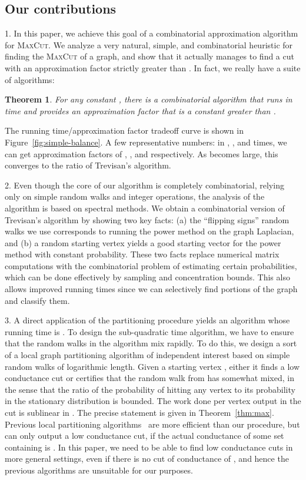 \documentclass[11pt]{article}
\newtheorem{theorem}{Theorem}[section]
\def\maxcut{\textsc{MaxCut}\xspace}
\begin{document}
\subsection{Our contributions}

1. In this paper, we achieve this goal of a combinatorial approximation
algorithm for \maxcut. We analyze a very natural, simple, and combinatorial
heuristic for finding the \maxcut of a graph, and show that it actually manages
to find a cut with an approximation factor strictly greater than . In fact, we really
have a suite of algorithms:
\begin{theorem} \label{thm:main}
For any constant , there is a combinatorial algorithm
that runs in  time and provides
an approximation factor that is a constant greater than .
\end{theorem}
The running time/approximation factor tradeoff curve is
shown in Figure~\ref{fig:simple-balance}. A few representative numbers: in
, , and  times, we can get
approximation factors of , , and  respectively. As 
becomes large, this converges to the ratio of Trevisan's algorithm.


2. Even though the core of our algorithm is completely combinatorial, relying only on simple random walks and integer operations, the analysis of the algorithm is based on spectral methods. We obtain a combinatorial version of Trevisan's algorithm by showing two key facts: (a) the ``flipping signs'' random walks we use corresponds to running the power method on the graph Laplacian, and (b) a random starting vertex yields a good starting vector for the power method with constant probability. These two facts replace numerical matrix computations with the combinatorial problem of estimating certain probabilities, which can be done effectively by sampling and concentration bounds. This also allows improved running times since we can selectively find portions of the graph and classify them.

3. A direct application of the partitioning procedure yields an algorithm whose running time is . To design the sub-quadratic time algorithm, we have to ensure that the random walks in the algorithm mix rapidly. To do this, we design a sort of a local graph partitioning algorithm of independent interest based on simple random walks of logarithmic length. Given a starting vertex ,
either it finds a low conductance cut or certifies that the random walk from  has somewhat mixed, in the sense that the ratio of the probability of hitting any vertex  to its probability in the stationary distribution is bounded. The work done per vertex output in the cut is sublinear in . The precise statement is given in Theorem~\ref{thm:max}.
Previous local partitioning algorithms~\cite{ST04, ACL06, AL08} are more efficient than our procedure, but
can only output a low conductance cut, if the actual conductance of some set containing  is .
In this paper, we need to be able to find low conductance cuts in more general settings, even if there is no cut of conductance of , and hence the previous algorithms are unsuitable for our purposes.
\end{document}
